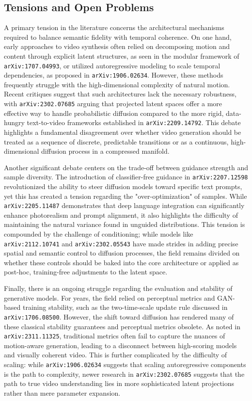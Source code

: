 \documentclass[11pt]{article}
\begin{document}
\subsection{Tensions and Open Problems}

A primary tension in the literature concerns the architectural mechanisms required to balance semantic fidelity with temporal coherence. On one hand, early approaches to video synthesis often relied on decomposing motion and content through explicit latent structures, as seen in the modular framework of \texttt{arXiv:1707.04993}, or utilized autoregressive modeling to scale temporal dependencies, as proposed in \texttt{arXiv:1906.02634}. However, these methods frequently struggle with the high-dimensional complexity of natural motion. Recent critiques suggest that such architectures lack the necessary robustness, with \texttt{arXiv:2302.07685} arguing that projected latent spaces offer a more effective way to handle probabilistic diffusion compared to the more rigid, data-hungry text-to-video frameworks established in \texttt{arXiv:2209.14792}. This debate highlights a fundamental disagreement over whether video generation should be treated as a sequence of discrete, predictable transitions or as a continuous, high-dimensional diffusion process in a compressed manifold.

Another significant debate centers on the trade-off between guidance strength and sample diversity. The introduction of classifier-free guidance in \texttt{arXiv:2207.12598} revolutionized the ability to steer diffusion models toward specific text prompts, yet this has created a tension regarding the "over-optimization" of samples. While \texttt{arXiv:2205.11487} demonstrates that deep language integration can significantly enhance photorealism and prompt alignment, it also highlights the difficulty of maintaining the natural variance found in unguided distributions. This tension is compounded by the challenge of conditioning; while models like \texttt{arXiv:2112.10741} and \texttt{arXiv:2302.05543} have made strides in adding precise spatial and semantic control to diffusion processes, the field remains divided on whether these controls should be baked into the core architecture or applied as post-hoc, training-free adjustments to the latent space.

Finally, there is an ongoing struggle regarding the evaluation and stability of generative models. For years, the field relied on perceptual metrics and GAN-based training stability, such as the two-time-scale update rule discussed in \texttt{arXiv:1706.08500}. However, the shift toward diffusion has rendered many of these classical stability guarantees and perceptual metrics obsolete. As noted in \texttt{arXiv:2311.11325}, traditional metrics often fail to capture the nuances of motion-aware generation, leading to a disconnect between high-scoring models and visually coherent video. This is further complicated by the difficulty of scaling: while \texttt{arXiv:1906.02634} suggests that scaling autoregressive components is the path to complexity, newer research in \texttt{arXiv:2302.07685} suggests that the path to true video understanding lies in more sophisticated latent projections rather than mere parameter expansion.
\end{document}
